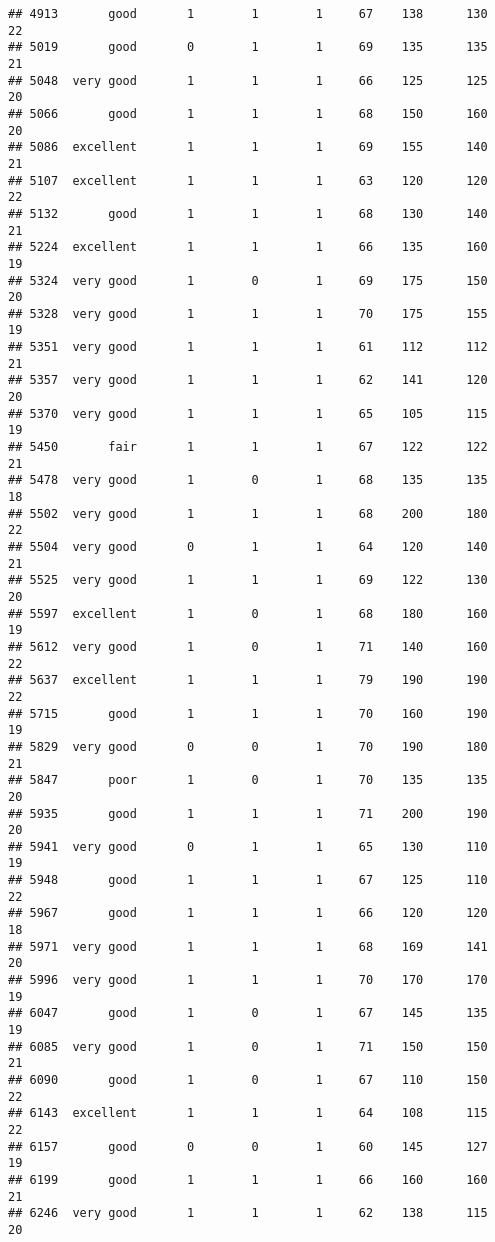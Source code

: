 \documentclass[]{article}
\begin{document}
\begin{verbatim}
## 4913       good       1        1        1     67    138      130  22
## 5019       good       0        1        1     69    135      135  21
## 5048  very good       1        1        1     66    125      125  20
## 5066       good       1        1        1     68    150      160  20
## 5086  excellent       1        1        1     69    155      140  21
## 5107  excellent       1        1        1     63    120      120  22
## 5132       good       1        1        1     68    130      140  21
## 5224  excellent       1        1        1     66    135      160  19
## 5324  very good       1        0        1     69    175      150  20
## 5328  very good       1        1        1     70    175      155  19
## 5351  very good       1        1        1     61    112      112  21
## 5357  very good       1        1        1     62    141      120  20
## 5370  very good       1        1        1     65    105      115  19
## 5450       fair       1        1        1     67    122      122  21
## 5478  very good       1        0        1     68    135      135  18
## 5502  very good       1        1        1     68    200      180  22
## 5504  very good       0        1        1     64    120      140  21
## 5525  very good       1        1        1     69    122      130  20
## 5597  excellent       1        0        1     68    180      160  19
## 5612  very good       1        0        1     71    140      160  22
## 5637  excellent       1        1        1     79    190      190  22
## 5715       good       1        1        1     70    160      190  19
## 5829  very good       0        0        1     70    190      180  21
## 5847       poor       1        0        1     70    135      135  20
## 5935       good       1        1        1     71    200      190  20
## 5941  very good       0        1        1     65    130      110  19
## 5948       good       1        1        1     67    125      110  22
## 5967       good       1        1        1     66    120      120  18
## 5971  very good       1        1        1     68    169      141  20
## 5996  very good       1        1        1     70    170      170  19
## 6047       good       1        0        1     67    145      135  19
## 6085  very good       1        0        1     71    150      150  21
## 6090       good       1        0        1     67    110      150  22
## 6143  excellent       1        1        1     64    108      115  22
## 6157       good       0        0        1     60    145      127  19
## 6199       good       1        1        1     66    160      160  21
## 6246  very good       1        1        1     62    138      115  20

\end{verbatim}
\end{document}
